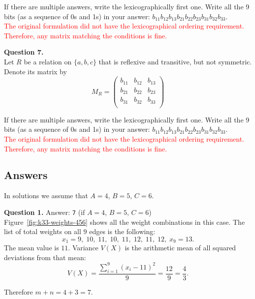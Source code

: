 \documentclass[jou]{apa6}
\begin{document}
If there are multiple answers, write the lexicographically first one.
Write all the 9 bits (as a sequence of 0s and 1s) in your answer: $b_{11}b_{12}b_{13}b_{21}b_{22}b_{23}b_{31}b_{32}b_{33}$.\\
{\footnotesize
\textcolor{red}{The original formulation did not have the lexicographical ordering requirement. Therefore, 
any matrix matching the conditions is fine.}
}




\vspace{6pt}
{\bf Question 7.}\\
Let $R$ be a relation on $\{a, b, c\}$ that is reflexive and transitive, but not symmetric.
Denote its matrix by
$$M_R =  \left( \begin{array}{ccc}
b_{11} & b_{12} & b_{13} \\
b_{21} & b_{22} & b_{23} \\
b_{31} & b_{32} & b_{33} \\
\end{array} \right)$$

If there are multiple answers, write the lexicographically first one. 
Write all the 9 bits (as a sequence of 0s and 1s) in your answer: $b_{11}b_{12}b_{13}b_{21}b_{22}b_{23}b_{31}b_{32}b_{33}$.\\
{\footnotesize
\textcolor{red}{The original formulation did not have the lexicographical ordering requirement. Therefore, 
any matrix matching the conditions is fine.}
}



\newpage

\subsection{Answers}

In solutions we assume that $A = 4$, $B = 5$, $C = 6$. 

\vspace{6pt}
{\bf Question 1.} Answer: {\tt 7} (if $A = 4$, $B = 5$, $C = 6$)\\ 

Figure~\ref{fig:k33-weights-456} shows all the weight combinations in this case. 
The list of total weights on all $9$ edges is the following: 
$$x_1 = 9,\;10,\;11,\;10,\;11,\;12,\;11,\;12,\;x_9 = 13.$$
The mean value is $11$. Variance $V(X)$ is the arithmetic mean of all squared deviations from that mean:
$$V(X) = \frac{\sum_{i=1}^9 (x_i - 11)^2}{9} = \frac{12}{9} = \frac{4}{3}.$$

Therefore $m+n = 4+3 = 7$.
\end{document}
